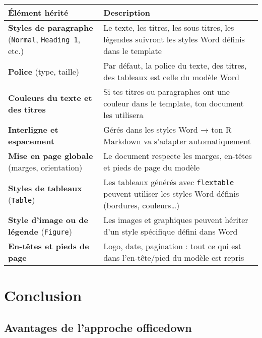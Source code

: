 \documentclass[
]{article}
\begin{document}
\begin{longtable}[]{@{}
  >{\raggedright\arraybackslash}p{}
  >{\raggedright\arraybackslash}p{}@{}}
\toprule\noalign{}
\begin{minipage}[b]{\linewidth}\raggedright
Élément hérité
\end{minipage} & \begin{minipage}[b]{\linewidth}\raggedright
Description
\end{minipage} \\
\midrule\noalign{}
\endhead
\bottomrule\noalign{}
\endlastfoot
\textbf{Styles de paragraphe} (\texttt{Normal}, \texttt{Heading\ 1},
etc.) & Le texte, les titres, les sous-titres, les légendes suivront les
styles Word définis dans le template \\
\textbf{Police} (type, taille) & Par défaut, la police du texte, des
titres, des tableaux est celle du modèle Word \\
\textbf{Couleurs du texte et des titres} & Si tes titres ou paragraphes
ont une couleur dans le template, ton document les utilisera \\
\textbf{Interligne et espacement} & Gérés dans les styles Word → ton R
Markdown va s'adapter automatiquement \\
\textbf{Mise en page globale} (marges, orientation) & Le document
respecte les marges, en-têtes et pieds de page du modèle \\
\textbf{Styles de tableaux} (\texttt{Table}) & Les tableaux générés avec
\texttt{flextable} peuvent utiliser les styles Word définis (bordures,
couleurs\ldots) \\
\textbf{Style d'image ou de légende} (\texttt{Figure}) & Les images et
graphiques peuvent hériter d'un style spécifique défini dans Word \\
\textbf{En-têtes et pieds de page} & Logo, date, pagination : tout ce
qui est dans l'en-tête/pied du modèle est repris \\
\end{longtable}

\section{Conclusion}\label{conclusion}

\subsection{Avantages de l'approche
officedown}\label{avantages-de-lapproche-officedown}
\end{document}
